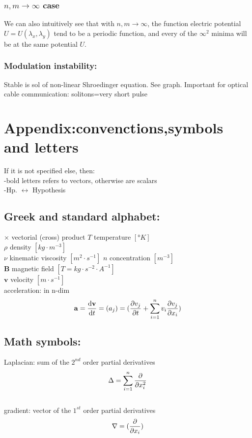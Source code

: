 \documentclass[a4paper,11pt]{article}
\begin{document}
\subsubsection{$n,m \rightarrow \infty$ case} 
We can also intuitively see that with $n,m \rightarrow \infty$, the function electric potential $U=U(\lambda_x,\lambda_y)$ tend to be a periodic function, and every of the $\infty^2$ minima will be at the same potential $U$.

\subsubsection{Modulation instability:}
Stable is sol of non-linear Shroedinger equation. See graph.
Important for optical cable communication: solitons=very short pulse


 
 
 
 
 
 
 
 
 
 
 
 
 
 
 
 
 \section{Appendix:convenctions,symbols and letters}
 If it is not specified else, then:\\
 -bold letters refers to vectors, otherwise are scalars\\
 -Hp. $\leftrightarrow$ Hypothesis\\

	 \subsection{Greek and standard alphabet:}
$\times$ vectorial (cross) product
 $T$ temperature $[°K]$\\
 $\rho$ density $[kg \cdot m^{-3}]$\\
 $\nu$ kinematic viscosity $[m^2 \cdot s^{-1}]$
 $n$ concentration $[m^{-3}]$\\
 $\mathbf{B}$ magnetic field $[T=kg\cdot s^{-2}\cdot A^{-1}]$ \\
  $\mathbf{v}$ velocity $[m \cdot s^{-1}]$\\
 acceleration: in n-dim
 \[ \mathbf{a}= \dv{\mathbf{v}}{t}=(a_j)=(\pdv{v_j}{t}+ \sum_{i=1}^{n} v_i \pdv{v_j}{x_i} ) \]
 
 
 	\subsection{Math symbols:} %
 	
 Laplacian: sum of the $2^{nd}$ order partial derivatives\\
 \[ \Delta=\sum_{i=1}^{n} \pdv{}{x^2_i} \]  \\
 gradient: vector of the $1^{st}$ order partial derivatives\\
 \[ \nabla= (\pdv{}{x_i}) \]  \\
 
\end{document}
